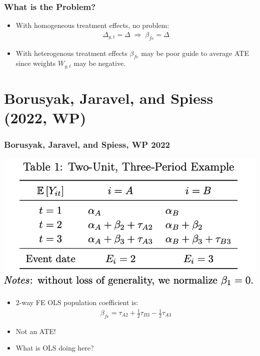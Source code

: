 \documentclass[english,xcolor=svgnames]{beamer}
\begin{document}
\begin{frame}
\frametitle[alignment=center]{What is the Problem?}
\begin{itemize}
	\item With homogeneous treatment effects, no problem:
	\begin{align*}
		 \Delta_{g,t}=\Delta \;\Rightarrow\; \beta_{fe} = \Delta
	\end{align*}
	\item With heterogenous treatment effects $\beta_{fe}$ may be poor guide to average ATE since weights $W_{g,t}$ may be negative.
\end{itemize}
\end{frame}

\section{Borusyak, Jaravel, and Spiess (2022, WP)}

\begin{frame}
\frametitle[alignment=center]{Borusyak, Jaravel, and Spiess, WP 2022}
\begin{center}
	\includegraphics[scale=0.5]{figures/BJSTAB1.png}
\end{center}
\begin{itemize}
	\item 2-way FE OLS population coefficient is:
	\begin{align*}
		\beta_{fe} = \tau_{A2} + \frac{1}{2}\tau_{B3} - \frac{1}{2}\tau_{A3}
	\end{align*}
	\item Not an ATE!
	\item What is OLS doing here?
\end{itemize}
\end{frame}
\end{document}
